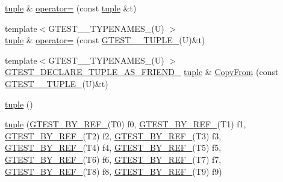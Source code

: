 \begin{DoxyCompactItemize}
\item 
\hyperlink{classstd_1_1tr1_1_1tuple}{tuple} \& \hyperlink{classstd_1_1tr1_1_1tuple_a410fb09fe0456542dc419b892f806aed}{operator=} (const \hyperlink{classstd_1_1tr1_1_1tuple}{tuple} \&t)
\item 
{\footnotesize template$<$\-G\-T\-E\-S\-T\-\_\-\_\-\-T\-Y\-P\-E\-N\-A\-M\-E\-S\-\_\-(\-U) $>$ }\\\hyperlink{classstd_1_1tr1_1_1tuple}{tuple} \& \hyperlink{classstd_1_1tr1_1_1tuple_a113b5abd2ad68add3262004677bf6c93}{operator=} (const \hyperlink{gtest-tuple_8h_a275e7bcd84299cc44b9c1dba971951c4}{\-G\-T\-E\-S\-T\-\_\-\_\-\-T\-U\-P\-L\-E\-\_\-}(\-U)\&t)
\item 
{\footnotesize template$<$\-G\-T\-E\-S\-T\-\_\-\_\-\-T\-Y\-P\-E\-N\-A\-M\-E\-S\-\_\-(\-U) $>$ }\\\hyperlink{gtest-tuple_8h_a2b20671273f514a88a6e9b8328e5f257}{\-G\-T\-E\-S\-T\-\_\-\-D\-E\-C\-L\-A\-R\-E\-\_\-\-T\-U\-P\-L\-E\-\_\-\-A\-S\-\_\-\-F\-R\-I\-E\-N\-D\-\_\-} \*
\hyperlink{classstd_1_1tr1_1_1tuple}{tuple} \& \hyperlink{classstd_1_1tr1_1_1tuple_abdf1be4345c0a786512e156d46814299}{\-Copy\-From} (const \hyperlink{gtest-tuple_8h_a275e7bcd84299cc44b9c1dba971951c4}{\-G\-T\-E\-S\-T\-\_\-\_\-\-T\-U\-P\-L\-E\-\_\-}(\-U)\&t)
\item 
\hyperlink{classstd_1_1tr1_1_1tuple_a530b48c0bc4312965b1aebb57f400e21}{tuple} ()
\item 
\hyperlink{classstd_1_1tr1_1_1tuple_ac9d924f232762cf4e8072ad05f1a1c73}{tuple} (\hyperlink{namespacestd_1_1tr1_a70eef1687deb32579a7162328afc3778}{\-G\-T\-E\-S\-T\-\_\-\-B\-Y\-\_\-\-R\-E\-F\-\_\-}(\-T0) f0, \hyperlink{namespacestd_1_1tr1_a70eef1687deb32579a7162328afc3778}{\-G\-T\-E\-S\-T\-\_\-\-B\-Y\-\_\-\-R\-E\-F\-\_\-}(\-T1) f1, \hyperlink{namespacestd_1_1tr1_a70eef1687deb32579a7162328afc3778}{\-G\-T\-E\-S\-T\-\_\-\-B\-Y\-\_\-\-R\-E\-F\-\_\-}(\-T2) f2, \hyperlink{namespacestd_1_1tr1_a70eef1687deb32579a7162328afc3778}{\-G\-T\-E\-S\-T\-\_\-\-B\-Y\-\_\-\-R\-E\-F\-\_\-}(\-T3) f3, \hyperlink{namespacestd_1_1tr1_a70eef1687deb32579a7162328afc3778}{\-G\-T\-E\-S\-T\-\_\-\-B\-Y\-\_\-\-R\-E\-F\-\_\-}(\-T4) f4, \hyperlink{namespacestd_1_1tr1_a70eef1687deb32579a7162328afc3778}{\-G\-T\-E\-S\-T\-\_\-\-B\-Y\-\_\-\-R\-E\-F\-\_\-}(\-T5) f5, \hyperlink{namespacestd_1_1tr1_a70eef1687deb32579a7162328afc3778}{\-G\-T\-E\-S\-T\-\_\-\-B\-Y\-\_\-\-R\-E\-F\-\_\-}(\-T6) f6, \hyperlink{namespacestd_1_1tr1_a70eef1687deb32579a7162328afc3778}{\-G\-T\-E\-S\-T\-\_\-\-B\-Y\-\_\-\-R\-E\-F\-\_\-}(\-T7) f7, \hyperlink{namespacestd_1_1tr1_a70eef1687deb32579a7162328afc3778}{\-G\-T\-E\-S\-T\-\_\-\-B\-Y\-\_\-\-R\-E\-F\-\_\-}(\-T8) f8, \hyperlink{namespacestd_1_1tr1_a70eef1687deb32579a7162328afc3778}{\-G\-T\-E\-S\-T\-\_\-\-B\-Y\-\_\-\-R\-E\-F\-\_\-}(\-T9) f9)

\end{DoxyCompactItemize}

